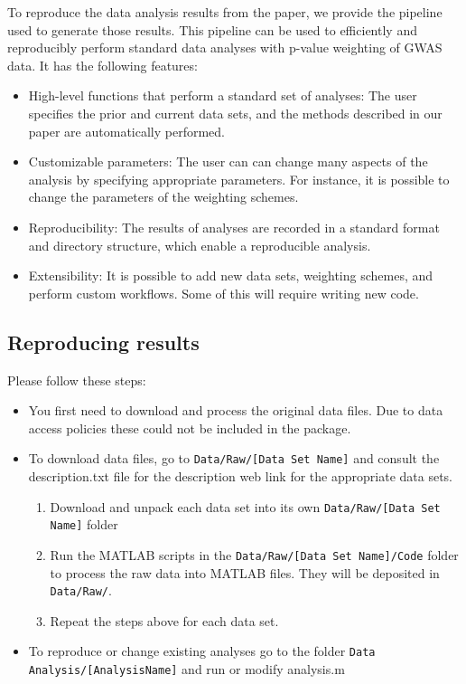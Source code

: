 \documentclass[english,11pt]{article} %
\begin{document}
To reproduce the data analysis results from the \cite{dobriban2015optimal} paper, we provide the pipeline used to generate those results. This pipeline can be used to efficiently and reproducibly perform standard data analyses with p-value weighting of GWAS data.  It has the following features:

\begin{itemize}
\item High-level functions that perform a standard set of analyses: The user specifies the prior and current data sets, and the methods described in our paper are automatically performed.

\item Customizable parameters: The user can can change many aspects of the analysis by specifying appropriate parameters. For instance, it is possible to change the parameters of the weighting schemes.

\item Reproducibility: The results of analyses are recorded in a standard format and directory structure, which enable a reproducible analysis.

\item Extensibility:  It is possible to add new data sets, weighting schemes, and perform custom workflows. Some of this will require writing new code.
\end{itemize}

\subsection{Reproducing results}

Please follow these steps:

\begin{itemize}
\item You first need to download and process the original data files. Due to data access policies these could not be included in the package.
\item To download data files, go to \verb+Data/Raw/[Data Set Name]+ and consult the description.txt file for the description web link for the appropriate data sets.
\begin{enumerate}
\item Download and unpack each data set into its own \verb+Data/Raw/[Data Set Name]+ folder
\item Run the MATLAB scripts in the \verb+Data/Raw/[Data Set Name]/Code+ folder to process the raw data into MATLAB files. They will be deposited in \verb+Data/Raw/+.
\item Repeat the steps above for each data set.
\end{enumerate}
\item To reproduce or change existing analyses go to the folder \verb+Data Analysis/[AnalysisName]+ and run or modify analysis.m
\end{itemize}
\end{document}

